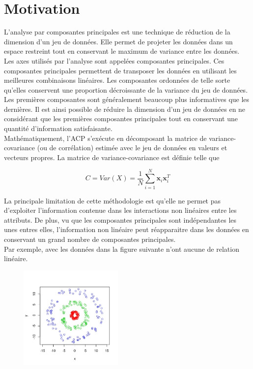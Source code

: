\section{Motivation}

L’analyse par composantes principales est une technique de réduction de la dimension d’un jeu de données. Elle permet de projeter les données dans un espace restreint tout en conservant le maximum de variance entre les données. Les axes utilisés par l’analyse sont appelées composantes principales. Ces composantes principales permettent de transposer les données en utilisant les meilleures combinaisons linéaires. Les composantes ordonnées de telle sorte qu’elles conservent une proportion décroissante de la variance du jeu de données. Les premières composantes sont généralement beaucoup plus informatives que les dernières. Il est ainsi possible de réduire la dimension d’un jeu de données en ne considérant que les premières composantes principales tout en conservant une quantité d’information satisfaisante.\\

Mathématiquement, l’ACP s'exécute en décomposant la matrice de variance-covariance (ou de corrélation) estimée avec le jeu de données en valeurs et vecteurs propres. La matrice de variance-covariance est définie telle que

$$C = Var(X) = \frac{1}{N} \sum_{i = 1}^{N}   \textbf{x}_i\textbf{x}_i^{T}$$

La principale limitation de cette méthodologie est qu’elle ne permet pas d’exploiter l’information contenue dans les interactions non linéaires entre les attributs. De plus, vu que les composantes principales sont indépendantes les unes entres elles, l'information non linéaire peut réapparaitre dans les données en conservant un grand nombre de composantes principales. \\

Par exemple, avec les données dans la figure suivante n'ont aucune de relation linéaire. 

\begin{figure}[H]
	\centering
	\includegraphics[width=2in]{sim-cercle}
\end{figure}

